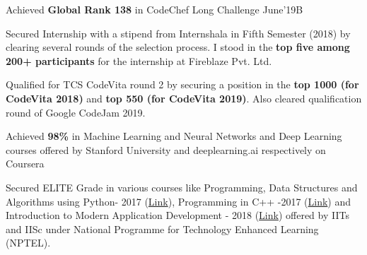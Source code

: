 \begin{cventries}
\begin{cvitems}
 \item {\fontsize{9pt}{1em}\bodyfontlight\upshape\color{text} Achieved \textbf{Global Rank 138} in CodeChef Long Challenge June’19B }
 \item {\fontsize{9pt}{1em}\bodyfontlight\upshape\color{text} {Secured Internship with a stipend from Internshala in Fifth Semester (2018) by clearing several rounds of the selection process. I stood in the \textbf{top five among 200+ participants} for the internship at Fireblaze Pvt. Ltd.}}
 \item{\fontsize{9pt}{1em}\bodyfontlight\upshape\color{text} Qualified for TCS CodeVita round 2 by securing a position in the \textbf{top 1000 (for CodeVita 2018)} and \textbf{top 550 (for CodeVita 2019)}. Also cleared qualification round of Google CodeJam 2019.}
  \item {\fontsize{9pt}{1em}\bodyfontlight\upshape\color{text} {Achieved \textbf{98\%} in Machine Learning and Neural Networks and Deep Learning courses offered by Stanford University and deeplearning.ai respectively on Coursera }}
\item {\fontsize{9pt}{1em}\bodyfontlight\upshape\color{text} Secured ELITE Grade in various courses like Programming, Data Structures and Algorithms using Python- 2017 (\href{https://nptel.ac.in/noc/Ecertificate/?q=noc17-cs28/NPTEL17CS28S1140194171011045.jpg}{Link}), Programming in C++ -2017 (\href{https://nptel.ac.in/noc/Ecertificate/?q=noc17-cs24/NPTEL17CS24S2150185171011045.jpg}{Link}) and Introduction to Modern Application Development - 2018 (\href{https://nptel.ac.in/noc/Ecertificate/?q=noc18-cs03/NPTEL18CS03S31601201810063149.jpg}{Link}) offered by IITs and IISc under National Programme for Technology Enhanced Learning (NPTEL).}
       
\end{cvitems}
   \vspace{0.5 cm}   
\end{cventries}
